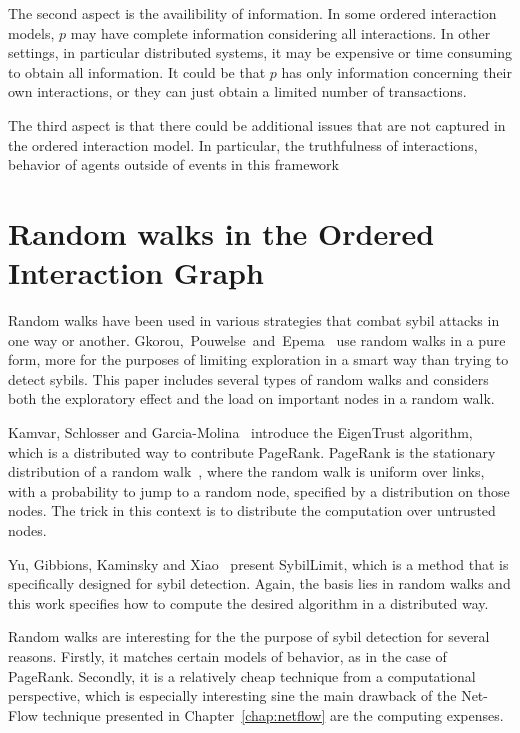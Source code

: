 \documentclass[a4paper,11pt]{book}
\theoremstyle{definition}
\begin{document}
The second aspect is the availibility of information. In some ordered interaction models, $p$ may
have complete information considering all interactions. In other settings, in particular distributed
systems, it may be expensive or time consuming to obtain all information. It could be that $p$ has only
information concerning their own interactions, or they can just obtain a limited number of transactions.

The third aspect is that there could be additional issues that are not captured in the ordered interaction
model. In particular, the truthfulness of interactions, behavior of agents outside of
events in this framework 




\section{Random walks in the Ordered Interaction Graph}

Random walks have been used in various strategies that combat sybil attacks
in one way or another. Gkorou,~Pouwelse~and~Epema~\cite{gkorou2015trust} use random walks
in a pure form, more for the purposes of limiting exploration in
a smart way than trying to detect sybils. This paper includes several types
of random walks and considers both the exploratory effect and the
load on important nodes in a random walk.

Kamvar, Schlosser and Garcia-Molina~\cite{kamvar2003eigentrust} introduce
the EigenTrust algorithm, which is a distributed way to contribute PageRank.
PageRank is the stationary distribution of a random walk~\cite{page1999pagerank},
where the random walk is uniform over links, with a probability to jump to a
random node, specified by a distribution on those nodes. The trick in this context
is to distribute the computation over untrusted nodes. 

Yu, Gibbions, Kaminsky and Xiao~\cite{yu2008sybillimit} present SybilLimit, which
is a method that is specifically designed for sybil detection. Again, the basis
lies in random walks and this work specifies how to compute the desired
algorithm in a distributed way.

Random walks are interesting for the the purpose of sybil detection for several reasons.
Firstly, it matches certain models of behavior, as in the case of PageRank. Secondly, it 
is a relatively cheap technique from a computational perspective, which is especially
interesting sine the main
drawback of the Net-Flow technique presented in Chapter~\ref{chap:netflow} 
are the computing expenses.
\end{document}
